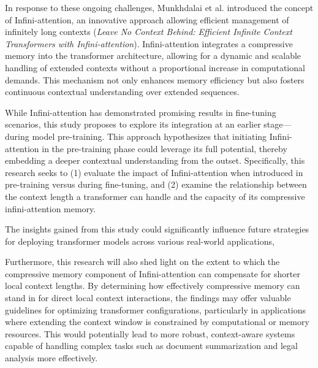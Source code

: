 In response to these ongoing challenges, Munkhdalai et al. introduced the concept of Infini-attention, an innovative approach allowing efficient management
 of infinitely long contexts (\textit{Leave No Context Behind: Efficient Infinite Context Transformers with Infini-attention}).
  Infini-attention integrates a compressive memory into the transformer architecture, allowing for a dynamic and scalable handling
   of extended contexts without a proportional increase in computational demands. This mechanism not only enhances memory efficiency
    but also fosters continuous contextual understanding over extended sequences.

While Infini-attention has demonstrated promising results in fine-tuning scenarios, this study proposes to explore its integration at an
 earlier stage—during model pre-training. This approach hypothesizes that initiating Infini-attention in the pre-training phase could
  leverage its full potential, thereby embedding a deeper contextual understanding from the outset. Specifically,
   this research seeks to (1) evaluate the impact of Infini-attention when introduced in pre-training versus during fine-tuning, 
   and (2) examine the relationship between the context length a transformer can handle and the capacity of its compressive infini-attention memory.

The insights gained from this study could significantly influence future strategies for deploying transformer models across various real-world applications,

 Furthermore, this research will also shed light on the extent to which the compressive memory component of Infini-attention can compensate for shorter local context lengths. 
 By determining how effectively compressive memory can stand in for direct local context interactions, the findings may offer valuable guidelines for
  optimizing transformer configurations, particularly in applications where extending the context window is constrained by computational or memory resources.
  This would potentially lead to more robust, context-aware systems capable of handling complex tasks such as document summarization and legal analysis more effectively.


